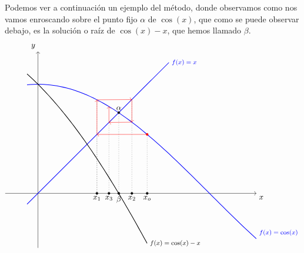        \begin{intgraf} Podemos ver a continuación un ejemplo del método, donde observamos como nos vamos enroscando sobre el punto fijo $\alpha$ de $\cos(x)$, que como se puede observar debajo, es la solución o raíz de $\cos(x)-x$, que hemos llamado $\beta$.
$$\begin{tikzpicture}[scale=5, domain=-1:2, samples=70,  trig format=rad]
	
	\draw[->] (-0.3,0) -- (2,0) node[below right] {$x$};
	\draw[->] (0,-0.5) -- (0,1.3) node[above left] {$y$};
	
	\draw[blue, thick] plot[domain=-0.1:2] (\x,{cos(\x)}) node[above right] {\footnotesize $f(x)=\cos(x)$};
    \draw[blue, thick] plot[domain=-0.1:1.2] (\x,{(\x)}) node[right] {\footnotesize $f(x)=x$};
    \draw[black, thick] plot[domain=-0.1:1] (\x,{cos(\x)-\x}) node[right] {\footnotesize $f(x)=\cos(x)-x$};

    \draw[fill=black] (0.74,0.74) circle [radius=0.01] node[above] {$\alpha$};
    \draw[fill=black] (0.74,0) circle [radius=0.01] node[below] {$\beta$};
    \draw[dotted] (0.74,0.74) -- (0.74,0);
    \def\x{1}
    \draw[fill=black] (\x,0) circle [radius=0.01] node[below] {$x_o$};
    \draw[dotted] (\x,0) -- (\x,{cos(\x)});
    \def\y{0.54}
    \draw[fill=black] (\y,0) circle [radius=0.01] node[below] {$x_1$};
    \draw[dotted] (\y,0) -- (\y,\y);
    \draw[red,fill=red] (\x,{cos(\x)}) circle [radius=0.01];
    \draw[->,red](\x,{cos(\x)}) -- (\y,\y) ;
    \draw[dotted] (\y,0) -- (\y,{cos(\y)}); 
    \draw[->,red](\y,\y) -- (\y,{cos(\y)});

    \def\z{0.86}
    \draw[fill=black](\z,0) circle [radius=0.01] node[below] {$x_2$};
    \draw[dotted] (\z,0) -- (\z,\z);
    \draw[->,red] (\y,{cos(\y)}) -- (\z,\z);
    \draw[red,->] (\z,\z) -- (\z,{cos(\z)});

    \def\t{0.65}
    \draw[fill=black](\t,0) circle [radius=0.01] node[below] {$x_3$};
    \draw[dotted] (\t,0) -- (\t,\t);
    \draw[->,red] (\z,{cos(\z)}) -- (\t,\t);
    \draw[red,->] (\t,\t) -- (\t,{cos(\t)});

    
\end{tikzpicture}$$
       \end{intgraf}
